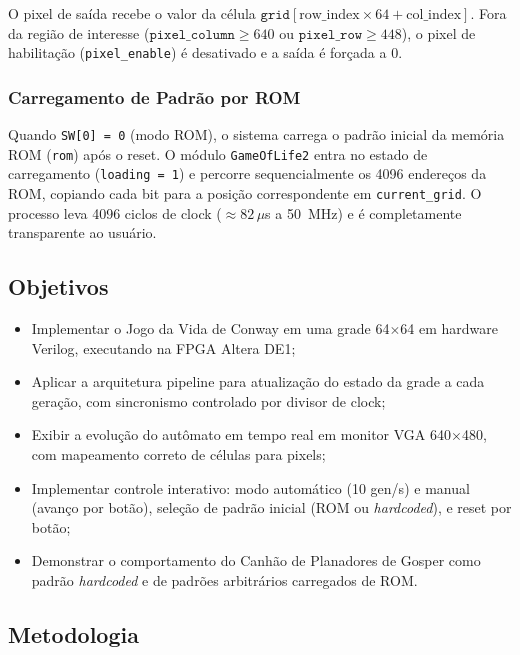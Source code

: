 \documentclass[12pt, a4paper]{article}
\begin{document}
	O pixel de saída recebe o valor da célula $\texttt{grid}[\text{row\_index}
	\times 64 + \text{col\_index}]$. Fora da região de interesse
	($\texttt{pixel\_column} \geq 640$ ou $\texttt{pixel\_row} \geq 448$), o pixel
	de habilitação (\texttt{pixel\_enable}) é desativado e a saída é forçada a $0$.
	
	\subsubsection{Carregamento de Padrão por ROM}
	
	Quando \texttt{SW[0] = 0} (modo ROM), o sistema carrega o padrão inicial da
	memória ROM (\texttt{rom}) após o reset. O módulo \texttt{GameOfLife2} entra no
	estado de carregamento (\texttt{loading = 1}) e percorre sequencialmente os
	4096 endereços da ROM, copiando cada bit para a posição correspondente em
	\texttt{current\_grid}. O processo leva 4096 ciclos de clock ($\approx 82\,\mu$s
	a 50~MHz) e é completamente transparente ao usuário.
	
	\subsection{Objetivos}
	
	\begin{itemize}
		\item Implementar o Jogo da Vida de Conway em uma grade 64$\times$64 em
		hardware Verilog, executando na FPGA Altera DE1;
		\item Aplicar a arquitetura pipeline para atualização do estado da grade
		a cada geração, com sincronismo controlado por divisor de clock;
		\item Exibir a evolução do autômato em tempo real em monitor VGA
		640$\times$480, com mapeamento correto de células para pixels;
		\item Implementar controle interativo: modo automático (10 gen/s) e manual
		(avanço por botão), seleção de padrão inicial (ROM ou \textit{hardcoded}),
		e reset por botão;
		\item Demonstrar o comportamento do Canhão de Planadores de Gosper como
		padrão \textit{hardcoded} e de padrões arbitrários carregados de ROM.
	\end{itemize}
	
	\subsection{Metodologia}
	
\end{document}
